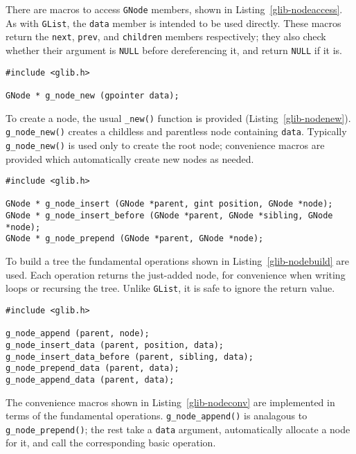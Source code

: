 There are macros to access \lstinline{GNode} members, shown in Listing~\ref{glib-nodeaccess}. As with \lstinline{GList}, the \lstinline{data} member is intended to be used directly. These macros return the \lstinline{next}, \lstinline{prev}, and \lstinline{children} members respectively; they also check whether their argument is \lstinline{NULL} before dereferencing it, and return \lstinline{NULL} if it is.

\begin{lstlisting}[float, caption={Creating a \lstinline{GNode}}, label=glib-nodenew]
#include <glib.h>

GNode * g_node_new (gpointer data);
\end{lstlisting}

To create a node, the usual \lstinline{_new()} function is provided (Listing~\ref{glib-nodenew}). \lstinline{g_node_new()} creates a childless and parentless node containing \lstinline{data}. Typically \lstinline{g_node_new()} is used only to create the root node; convenience macros are provided which automatically create new nodes as needed.

\begin{lstlisting}[float, caption={Building a \lstinline{GNode} tree}, label=glib-nodebuild]
#include <glib.h>

GNode * g_node_insert (GNode *parent, gint position, GNode *node);
GNode * g_node_insert_before (GNode *parent, GNode *sibling, GNode *node);
GNode * g_node_prepend (GNode *parent, GNode *node);
\end{lstlisting}

To build a tree the fundamental operations shown in Listing~\ref{glib-nodebuild} are used. Each operation returns the just-added node, for convenience when writing loops or recursing the tree. Unlike \lstinline{GList}, it is safe to ignore the return value.

\begin{lstlisting}[float, caption={Building a \lstinline{GNode}}, label=glib-nodeconv]
#include <glib.h>

g_node_append (parent, node);
g_node_insert_data (parent, position, data);
g_node_insert_data_before (parent, sibling, data);
g_node_prepend_data (parent, data);
g_node_append_data (parent, data);
\end{lstlisting}

The convenience macros shown in Listing~\ref{glib-nodeconv} are implemented in terms of the fundamental operations. \lstinline{g_node_append()} is analagous to \lstinline{g_node_prepend()}; the rest take a \lstinline{data} argument, automatically allocate a node for it, and call the corresponding basic operation.

